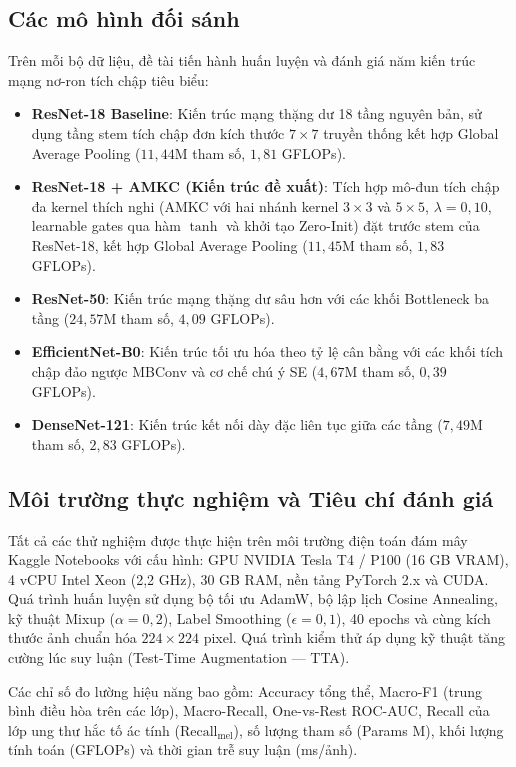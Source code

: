 \subsection{Các mô hình đối sánh}

Trên mỗi bộ dữ liệu, đề tài tiến hành huấn luyện và đánh giá năm kiến trúc mạng nơ-ron tích chập tiêu biểu:

\begin{itemize}
  \item \textbf{ResNet-18 Baseline}: Kiến trúc mạng thặng dư 18 tầng nguyên bản, sử dụng tầng stem tích chập đơn kích thước $7\times7$ truyền thống kết hợp Global Average Pooling ($11{,}44$M tham số, $1{,}81$ GFLOPs).
  \item \textbf{ResNet-18 + AMKC (Kiến trúc đề xuất)}: Tích hợp mô-đun tích chập đa kernel thích nghi (AMKC với hai nhánh kernel $3\times3$ và $5\times5$, $\lambda = 0{,}10$, learnable gates qua hàm $\tanh$ và khởi tạo Zero-Init) đặt trước stem của ResNet-18, kết hợp Global Average Pooling ($11{,}45$M tham số, $1{,}83$ GFLOPs).
  \item \textbf{ResNet-50}: Kiến trúc mạng thặng dư sâu hơn với các khối Bottleneck ba tầng ($24{,}57$M tham số, $4{,}09$ GFLOPs).
  \item \textbf{EfficientNet-B0}: Kiến trúc tối ưu hóa theo tỷ lệ cân bằng với các khối tích chập đảo ngược MBConv và cơ chế chú ý SE ($4{,}67$M tham số, $0{,}39$ GFLOPs).
  \item \textbf{DenseNet-121}: Kiến trúc kết nối dày đặc liên tục giữa các tầng ($7{,}49$M tham số, $2{,}83$ GFLOPs).
\end{itemize}

\subsection{Môi trường thực nghiệm và Tiêu chí đánh giá}

Tất cả các thử nghiệm được thực hiện trên môi trường điện toán đám mây Kaggle Notebooks với cấu hình: GPU NVIDIA Tesla T4 / P100 (16 GB VRAM), 4 vCPU Intel Xeon (2,2 GHz), 30 GB RAM, nền tảng PyTorch 2.x và CUDA. Quá trình huấn luyện sử dụng bộ tối ưu AdamW, bộ lập lịch Cosine Annealing, kỹ thuật Mixup ($\alpha = 0{,}2$), Label Smoothing ($\epsilon = 0{,}1$), 40 epochs và cùng kích thước ảnh chuẩn hóa $224 \times 224$ pixel. Quá trình kiểm thử áp dụng kỹ thuật tăng cường lúc suy luận (Test-Time Augmentation --- TTA).

Các chỉ số đo lường hiệu năng bao gồm: Accuracy tổng thể, Macro-F1 (trung bình điều hòa trên các lớp), Macro-Recall, One-vs-Rest ROC-AUC, Recall của lớp ung thư hắc tố ác tính ($\mathrm{Recall}_{\mathrm{mel}}$), số lượng tham số (Params M), khối lượng tính toán (GFLOPs) và thời gian trễ suy luận (ms/ảnh).

